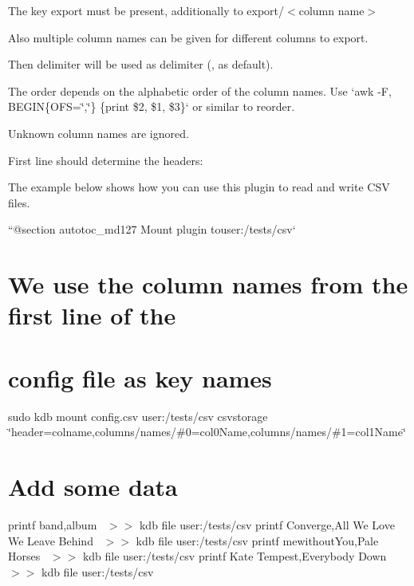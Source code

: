 \begin{DoxyItemize}
\item The key {\ttfamily export} must be present, additionally to {\ttfamily export/$<$column name$>$}
\item Also multiple column names can be given for different columns to export.
\begin{DoxyItemize}
\item Then {\ttfamily delimiter} will be used as delimiter ({\ttfamily ,} as default).
\item The order depends on the alphabetic order of the column names. Use `awk -\/F\textquotesingle{},\textquotesingle{} \textquotesingle{}B\+E\+G\+IN\{O\+FS=\char`\"{},\char`\"{}\} \{print \$2, \$1, \$3\}\textquotesingle{}` or similar to reorder.
\item Unknown column names are ignored.
\end{DoxyItemize}
\end{DoxyItemize}

First line should determine the headers\+:




The example below shows how you can use this plugin to read and write C\+SV files.

``{\ttfamily  @section autotoc\+\_\+md127 Mount plugin to}user\+:/tests/csv` \hypertarget{autotoc_md123_autotoc_md128}{}\section{We use the column names from the first line of the}\label{autotoc_md123_autotoc_md128}
\hypertarget{autotoc_md123_autotoc_md129}{}\section{config file as key names}\label{autotoc_md123_autotoc_md129}
sudo kdb mount config.\+csv user\+:/tests/csv csvstorage \char`\"{}header=colname,columns/names/\#0=col0\+Name,columns/names/\#1=col1\+Name\char`\"{}\hypertarget{autotoc_md123_autotoc_md130}{}\section{Add some data}\label{autotoc_md123_autotoc_md130}
printf \textquotesingle{}band,album~\newline
\textquotesingle{} $>$$>$ {\ttfamily kdb file user\+:/tests/csv} printf \textquotesingle{}Converge,All We Love We Leave Behind~\newline
\textquotesingle{} $>$$>$ {\ttfamily kdb file user\+:/tests/csv} printf \textquotesingle{}mewithout\+You,Pale Horses~\newline
\textquotesingle{} $>$$>$ {\ttfamily kdb file user\+:/tests/csv} printf \textquotesingle{}Kate Tempest,Everybody Down~\newline
\textquotesingle{} $>$$>$ {\ttfamily kdb file user\+:/tests/csv}

